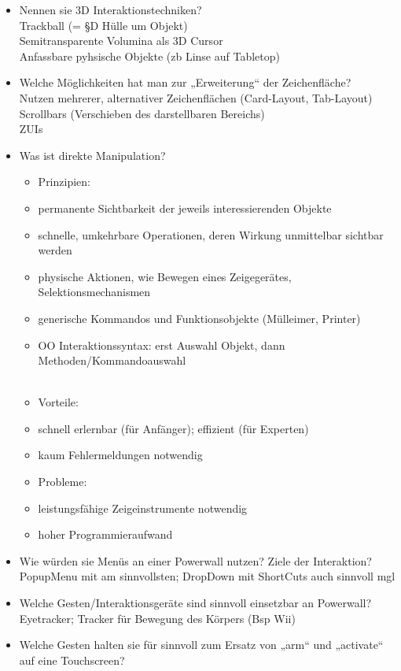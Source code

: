 \begin{itemize}
	\item Nennen sie 3D Interaktionstechniken?\\
	Trackball (= §D Hülle um Objekt)\\
	Semitransparente Volumina als 3D Cursor\\
	Anfassbare pyhsische Objekte (zb Linse auf Tabletop)
	
	\item Welche Möglichkeiten hat man zur „Erweiterung“ der Zeichenfläche?\\
	Nutzen mehrerer, alternativer Zeichenflächen (Card-Layout, Tab-Layout)\\
	Scrollbars (Verschieben des darstellbaren Bereichs)\\
	ZUIs
	
	\item Was ist direkte Manipulation?\\
	\begin{itemize}
		\item Prinzipien:
		\item permanente Sichtbarkeit der jeweils interessierenden Objekte
		\item schnelle, umkehrbare Operationen, deren Wirkung unmittelbar sichtbar werden
		\item physische Aktionen, wie Bewegen eines Zeigegerätes, Selektionsmechanismen
		\item generische Kommandos und Funktionsobjekte (Mülleimer, Printer)
		\item OO Interaktionssyntax: erst Auswahl Objekt, dann Methoden/Kommandoauswahl
		\\\\
		\item Vorteile:
		\item schnell erlernbar (für Anfänger); effizient (für Experten)
		\item kaum Fehlermeldungen notwendig
		\item Probleme:
		\item leistungsfähige Zeigeinstrumente notwendig
		\item hoher Programmieraufwand
	\end{itemize}
	\item Wie würden sie Menüs an einer Powerwall nutzen? Ziele der Interaktion?\\
	PopupMenu mit am sinnvollsten; DropDown mit ShortCuts auch sinnvoll mgl\\
	\item Welche Gesten/Interaktionsgeräte sind sinnvoll einsetzbar an Powerwall?\\
	Eyetracker; Tracker für Bewegung des Körpers (Bsp Wii)
	
	\item Welche Gesten halten sie für sinnvoll zum Ersatz von „arm“ und „activate“ auf eine Touchscreen?
\end{itemize}

